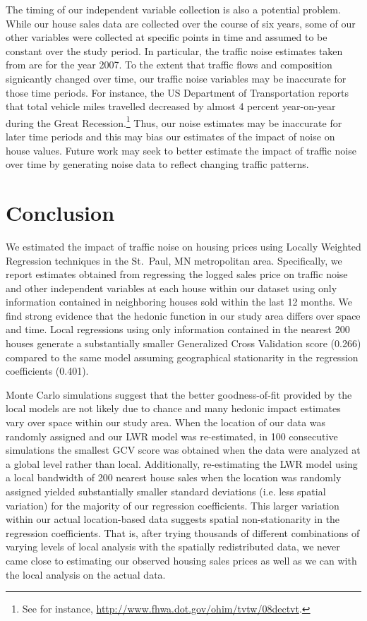 \documentclass{article}\usepackage{graphicx, color}
\begin{document}
The timing of our independent variable collection is also a potential problem. While our house sales data are collected over the course of six years, some of our other variables were collected at specific points in time and assumed to be constant over the study period. In particular, the traffic noise estimates taken from \citet{Nega2012} are for the year 2007. To the extent that traffic flows and composition signicantly changed over time, our traffic noise variables may be inaccurate for those time periods. For instance, the US Department of Transportation reports that total vehicle miles travelled decreased by almost 4 percent year-on-year during the Great Recession.\footnote{See for instance, \url{http://www.fhwa.dot.gov/ohim/tvtw/08dectvt}.} Thus, our noise estimates may be inaccurate for later time periods and this may bias our estimates of the impact of noise on house values. Future work may seek to better estimate the impact of traffic noise over time by generating noise data to reflect changing traffic patterns.

\section{Conclusion}

We estimated the impact of traffic noise on housing prices using Locally Weighted Regression techniques in the St.\ Paul, MN metropolitan area. Specifically, we report estimates obtained from regressing the logged sales price on traffic noise and other independent variables at each house within our dataset using only information contained in  neighboring houses sold within the last 12 months. We find strong evidence that the hedonic function in our study area differs over space and time. Local regressions using only information contained in the nearest 200 houses generate a substantially smaller Generalized Cross Validation score (0.266) compared to the same model assuming geographical stationarity in the regression coefficients (0.401). 

Monte Carlo simulations suggest that the better goodness-of-fit provided by the local models are not likely due to chance and many hedonic impact estimates vary over space within our study area. When the location of our data was randomly assigned and our LWR model was re-estimated, in 100 consecutive simulations the smallest GCV score was  obtained when the data were analyzed at a global level rather than local. Additionally, re-estimating the LWR model using a local bandwidth of 200 nearest house sales when the location was randomly assigned yielded substantially smaller standard deviations (i.e. less spatial variation) for the majority of our regression coefficients. This larger variation within our actual location-based data suggests spatial non-stationarity in the regression coefficients. That is, after trying thousands of different combinations of varying levels of local analysis with the spatially redistributed data, we never came close to estimating our observed housing sales prices as well as we can with the local analysis on the actual data. 
\end{document}
